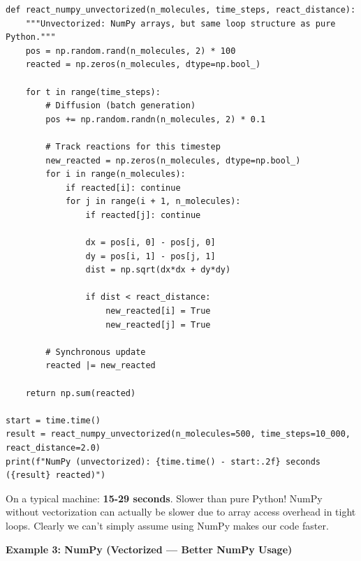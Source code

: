 \begin{lstlisting}
def react_numpy_unvectorized(n_molecules, time_steps, react_distance):
    """Unvectorized: NumPy arrays, but same loop structure as pure Python."""
    pos = np.random.rand(n_molecules, 2) * 100
    reacted = np.zeros(n_molecules, dtype=np.bool_)

    for t in range(time_steps):
        # Diffusion (batch generation)
        pos += np.random.randn(n_molecules, 2) * 0.1

        # Track reactions for this timestep
        new_reacted = np.zeros(n_molecules, dtype=np.bool_)
        for i in range(n_molecules):
            if reacted[i]: continue
            for j in range(i + 1, n_molecules):
                if reacted[j]: continue
                
                dx = pos[i, 0] - pos[j, 0]
                dy = pos[i, 1] - pos[j, 1]
                dist = np.sqrt(dx*dx + dy*dy)
                
                if dist < react_distance:
                    new_reacted[i] = True
                    new_reacted[j] = True

        # Synchronous update
        reacted |= new_reacted

    return np.sum(reacted)

start = time.time()
result = react_numpy_unvectorized(n_molecules=500, time_steps=10_000, react_distance=2.0)
print(f"NumPy (unvectorized): {time.time() - start:.2f} seconds ({result} reacted)")
\end{lstlisting}

\noindent On a typical machine: \textbf{15-29 seconds}. Slower than pure Python! NumPy without vectorization can actually be slower due to array access overhead in tight loops. Clearly we can't simply assume using NumPy makes our code faster.

\newpage 
\noindent \textbf{Example 3: NumPy (Vectorized --- Better NumPy Usage)}

